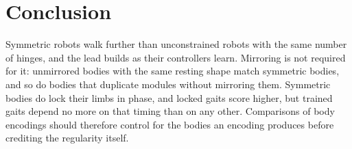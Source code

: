 \section{Conclusion}
\label{sec:conclusion}

Symmetric robots walk further than unconstrained robots with the same number of hinges, and the lead builds as their controllers learn. Mirroring is not required for it: unmirrored bodies with the same resting shape match symmetric bodies, and so do bodies that duplicate modules without mirroring them. Symmetric bodies do lock their limbs in phase, and locked gaits score higher, but trained gaits depend no more on that timing than on any other. Comparisons of body encodings should therefore control for the bodies an encoding produces before crediting the regularity itself.
